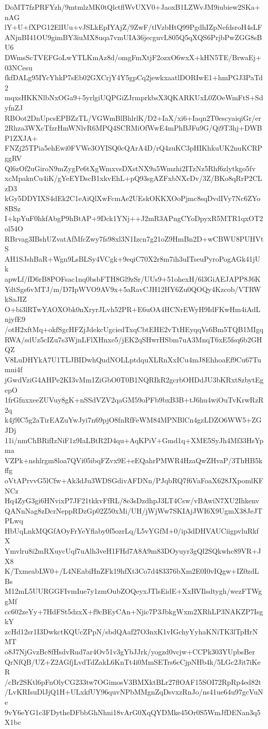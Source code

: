 DoMT7fzPRFYzh/9mtmlzMK0tQlctflWvUXV0+JaoxB1LZWvJM9iubiew2SKa+nAG
lY+U+fXPG12ElIUu+vJSLkEpIYAjZ/9ZwF/tlVzbHtQ99PgdhIZpNefdsroH4sLF
ANjnBI41OU9gimBY3iuMX8uqa7vmUIA36jecguvL805Q5qXQS6PrjbPwZGG8sBU6
DWmsScTVEFGoLwYTLKmAz8d/omgFmXtjF2ozxO6wxX+kHN5TE/BrwaEj+03NCesu
fkfDALg95IYcYhkP7sEb02GXCrjY4Y5gpCq2jewkxaatlDORIwE1+hmPGJ3PaTd2
mqxsHKKNlbNxOGa9+5yrlgiUQPGiZJrmprkbsX3QKARKUxL0ZOeWmFtS+SdyfnZJ
RBOot2DnUpcsEPBZzTL/VGWmBlBhlrlK/D2+IaX/xi6+Iaqn2T0escyaiqiGr/er
2Rhza3WXcTfzrHmWNlvR6MPQ4SCRMiOfWwE4mPhBJFu9G/Qi9T3hj+DWBP1ZXJA+
FNZj25TPia5ehEwi0FVWe3OYISQ0cQArA4D/rQ4zuKC3pHIKhkuUK2nuKCRPggRV
Ql6zOf2uGiroN9mZygPe6tXgWmxvsDXstNX9a5Wmzhi2ITzNz5Rhf6zlytkgo5fv
xcMpaknCu4iK/gYeEYDscB1xkvEhL+pQ93sgAZFxbNXcDv/3Z/BKo8qRrP2CLzD3
kGy5DDYIXS4dEk2C1eAiQlXwFcmAe2UEskOKKXOoPjmc8sqDvdIVy7Nc6ZYo8BSz
I+kpYuF0hkfAbgP9hBtAP+9Dck1YNj++J2mR3APngCYoDpyxR5MTR1qxOT2ol54O
RBrvag3IBshUZvatAfMfcZwy7fs98xl3N1Izcn7g21oZ9HmBn2D+wCBWU8PUHVtS
AH1SJshBaR+Wgn9LsBLSy4VCgk+9eqiC70X2r8m7ih3uITseuPyroPogAGk41jUk
apwLf/fD6rB8POFsac1nq0bsbFTH8Gl9zSr/UUs9+51ohexH/6l3GiAEJAPP8J6K
YdtSgs6vMTJ/m/D7IpWVO9AV9x+5aRavCJH12HY6Zu0QOQy4Kzcob/VTRWkSaJIZ
O+bi3lRTwYAOXObk0nXryrJLvh52PR+E6uOA4HCNrEWyH9IdFKwHm4iAdLnjyfE9
/otH2xftMq+okfSgcHFZjJdekcUgciedTxqCbtEHE2vTtHEyqqVs6Bm5TQB1MIgq
RWA/sdUz5cIZu7s3WjnLFlXHnxe5/jEK2qSHwrHSbm7uA3MnqT6xE5fsq6b2GHQZ
V8LuDHYkA7U1TLJBIDwhQudNOLLptdquXLRnXxICu4mJ8EhhoaEf9Cu67Tumni4f
jGwdVziG4AHPe2KI3vMm1ZiGbO0T0B1NQRIkR2gcrbOHDdJU3bKRxt8zbytEgepO
1frGfnxxeeZUVuy8gK+nSSdVZV2qaGM59oPFb9bxB3B+tJ6hu4wiOuTvKrwRzR2q
k4j9lC5g2aTirEAZuYwJyi7n69pjO8fnRfFeWM84MPNBlCn4gzLDZO6WW5+ZGJDj
11i/nmChBRifIzNiF1z9IaLBtR2D4qu+AqKPiV+Gmd1q+XME5SyJh4Mf33HsYpma
VZPk+nshlrgm8loa7QVi05ibqFZvx9E+eEQahrPMWR4HzaQwZHvaP/3ThHB5kffg
oVtAPrvvG5lCfw+Ak3dJu3WDSGdivAFDNn/PJqbRQ7f6VaFoaX628JXpomlKFNCz
Hq4ZyG3gi6HNvixP7JF21tkkvFfRL/8e3sDzdhpJ3LT4Csw/vBAwiN7XU2Ihkenv
QANnNag8zDcrNeppRDzGp02Z50xMi/UH/jWjWw7SKIAjJWI6X9UgmX38JeJTPLwq
HbUqLnkMQGfAOyFrYeYflaby0f5ozrLq/L5vYGfM+0/ip3dDHVAUCiigpvluRkfX
Ymvlru8i2mRXuycUqf7uAlh3veH1FHd7A8A9m83DOyuyr3gQl2SQkwhc89VR+JX8
K/TxmeabLW0+/L4NEabiHnZFk19hfXt3Co7d483376bXm2E0I0vIQgw+IZ0zdLBs
M12mL5UURGGFIvmIue7y1zmOubZOQeyxJTlsEidE+XxRVIlsdtygh/wezFTWggMf
cc602zeYy+7HdFSt5dzxX+f9cBEyCAn+Njic7P3JbkgWxm2XRhLP3NAKZP7IsgkY
zcHd12sr1I3DwkctKQUcZPpN/sbdQAaf27O3nxK1vIGchyYyhaKNiTK3lTpHrNMT
o8J7NjGvzBc8fHsdvRud7ar4Ov51v3gYbJJrk/yogzd0vcjw+CCPk303YUpbsBer
QrNfQB/UZ+Z2AGfjLvdTdZakL6KnTt4i0MmSETrs6cCjpNHb4k/5LGc2Jit7iKeR
/cBr2SKtl6pFnOlyCG233tw7OGimosV3BMXktBLr27flOAF15SOI72RpRp4ed82t
/LvKRIsuDlJjQ1H+ULxkfUY96quvNPbMMgnZqDsvxzRnJo/ns41ue64u97gcVuNe
9vY6eYG1c3FDytheDFbbGhNhni18vArG0XqQYDMke45Or0S5WmJfDENan3q5X1bc
